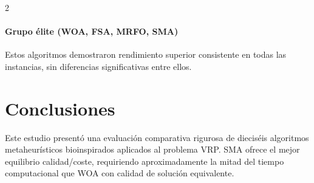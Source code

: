 \documentclass[10pt,a4paper]{extarticle}
\begin{document}
\begin{multicols}{2}
\paragraph{Grupo élite (WOA, FSA, MRFO, SMA)} Estos algoritmos demostraron rendimiento superior consistente en todas las instancias, sin diferencias significativas entre ellos.

\section{Conclusiones}
Este estudio presentó una evaluación comparativa rigurosa de dieciséis algoritmos metaheurísticos bioinspirados aplicados al problema VRP. SMA ofrece el mejor equilibrio calidad/coste, requiriendo aproximadamente la mitad del tiempo computacional que WOA con calidad de solución equivalente.

\end{multicols}
\end{document}
